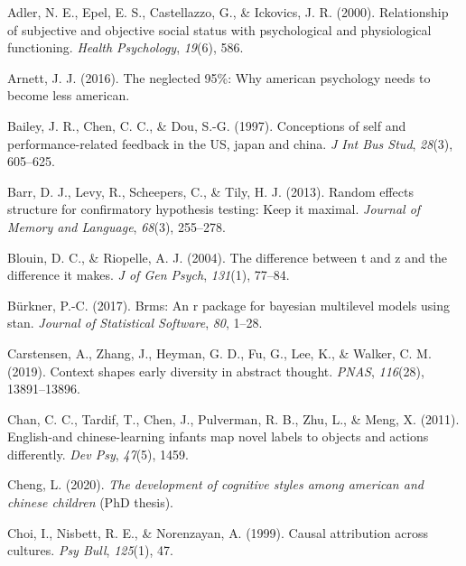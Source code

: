 \documentclass[
  man]{apa6}
\newlength{\cslhangindent}
\newlength{\cslentryspacingunit} %
\newenvironment{CSLReferences}[2] %
 {%
  \setlength{\parindent}{0pt}
  \ifodd #1
  \let\oldpar\par
  \def\par{\hangindent=\cslhangindent\oldpar}
  \fi
  \setlength{\parskip}{#2\cslentryspacingunit}
 }%
 {}
\begin{document}
\hypertarget{refs}{}
\begin{CSLReferences}{1}{0}
\leavevmode{}%
Adler, N. E., Epel, E. S., Castellazzo, G., \& Ickovics, J. R. (2000). Relationship of subjective and objective social status with psychological and physiological functioning. \emph{Health Psychology}, \emph{19}(6), 586.

\leavevmode{}%
Arnett, J. J. (2016). The neglected 95\%: Why american psychology needs to become less american.

\leavevmode{}%
Bailey, J. R., Chen, C. C., \& Dou, S.-G. (1997). Conceptions of self and performance-related feedback in the US, japan and china. \emph{J Int Bus Stud}, \emph{28}(3), 605--625.

\leavevmode{}%
Barr, D. J., Levy, R., Scheepers, C., \& Tily, H. J. (2013). Random effects structure for confirmatory hypothesis testing: Keep it maximal. \emph{Journal of Memory and Language}, \emph{68}(3), 255--278.

\leavevmode{}%
Blouin, D. C., \& Riopelle, A. J. (2004). The difference between t and z and the difference it makes. \emph{J of Gen Psych}, \emph{131}(1), 77--84.

\leavevmode{}%
Bürkner, P.-C. (2017). Brms: An r package for bayesian multilevel models using stan. \emph{Journal of Statistical Software}, \emph{80}, 1--28.

\leavevmode{}%
Carstensen, A., Zhang, J., Heyman, G. D., Fu, G., Lee, K., \& Walker, C. M. (2019). Context shapes early diversity in abstract thought. \emph{PNAS}, \emph{116}(28), 13891--13896.

\leavevmode{}%
Chan, C. C., Tardif, T., Chen, J., Pulverman, R. B., Zhu, L., \& Meng, X. (2011). English-and chinese-learning infants map novel labels to objects and actions differently. \emph{Dev Psy}, \emph{47}(5), 1459.

\leavevmode{}%
Cheng, L. (2020). \emph{The development of cognitive styles among american and chinese children} (PhD thesis).

\leavevmode{}%
Choi, I., Nisbett, R. E., \& Norenzayan, A. (1999). Causal attribution across cultures. \emph{Psy Bull}, \emph{125}(1), 47.


\end{CSLReferences}
\end{document}
